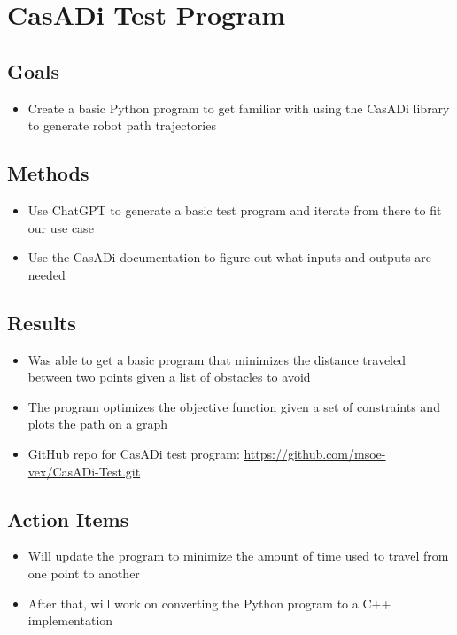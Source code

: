 \section{CasADi Test Program}

\subsection{Goals}
\begin{itemize}
    \item Create a basic Python program to get familiar with using the CasADi library to generate robot path trajectories
\end{itemize}

\subsection{Methods}
\begin{itemize}
    \item Use ChatGPT to generate a basic test program and iterate from there to fit our use case
    \item Use the CasADi documentation to figure out what inputs and outputs are needed 
\end{itemize}

\subsection{Results}
\begin{itemize}
    \item Was able to get a basic program that minimizes the distance traveled between two points given a list of obstacles to avoid
    \item The program optimizes the objective function given a set of constraints and plots the path on a graph
    \item GitHub repo for CasADi test program: \href{https://github.com/msoe-vex/CasADi-Test.git}{https://github.com/msoe-vex/CasADi-Test.git}
\end{itemize}

\subsection{Action Items}
\begin{itemize}
    \item Will update the program to minimize the amount of time used to travel from one point to another
    \item After that, will work on converting the Python program to a C++ implementation
\end{itemize}